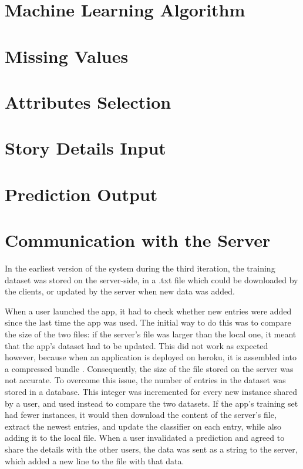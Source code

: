 \documentclass{mproj}
\begin{document}
\section{Machine Learning Algorithm}

\section{Missing Values}\label{missing_values}

\section{Attributes Selection}

\section{Story Details Input}

\section{Prediction Output}

\section{Communication with the Server}

In the earliest version of the system during the third iteration, the training dataset was stored on the server-side, in a .txt file which could be downloaded by the clients, or updated by the server when new data was added. \par

When a user launched the app, it had to check whether new entries were added since the last time the app was used. The initial way to do this was to compare the size of the two files: if the server's file was larger than the local one, it meant that the app's dataset had to be updated. This did not work as expected however, because when an application is deployed on heroku, it is assembled into a compressed bundle \cite{herokuslug}. Consequently, the size of the file stored on the server was not accurate. To overcome this issue, the number of entries in the dataset was stored in a database. This integer was incremented for every new instance shared by a user, and used instead to compare the two datasets. If the app's training set had fewer instances, it would then download the content of the server's file, extract the newest entries, and update the classifier on each entry, while also adding it to the local file. When a user invalidated a prediction and agreed to share the details with the other users, the data was sent as a string to the server, which added a new line to the file with that data.\par
\end{document}
